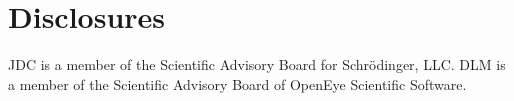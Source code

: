 \documentclass[9pt,lineno]{elife}
\begin{document}
\section{Disclosures}

JDC is a member of the Scientific Advisory Board for Schr\"{o}dinger, LLC.
DLM is a member of the Scientific Advisory Board of OpenEye Scientific Software.



\end{document}
